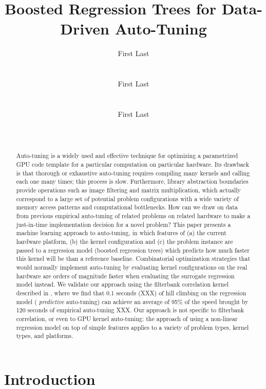\documentclass{sig-alternate}
\title{Boosted Regression Trees for Data-Driven Auto-Tuning}
\author{
\alignauthor First Last\\
\affaddr{Affiliation line 1}\\
\affaddr{Affiliation line 2}\\
\email{anon@mail.com}
\alignauthor First Last\\
\affaddr{Affiliation line 1}\\
\affaddr{Affiliation line 2}\\
\email{anon@mail.com}
\alignauthor First Last\\
\affaddr{Affiliation line 1}\\
\affaddr{Affiliation line 2}\\
\email{anon@mail.com}
}
\begin{document}
\maketitle

\begin{abstract}
Auto-tuning is a widely used and effective technique for optimizing a
parametrized GPU code template for a particular computation on particular
hardware.  Its drawback is that thorough or exhaustive auto-tuning requires
compiling many kernels and calling each one many times; this process is slow.
Furthermore, library abstraction boundaries provide operations such as image
filtering and matrix multiplication, which actually correspond to a large set
of potential problem configurations with a wide variety of memory access
patterns and computational bottlenecks.  How can we draw on data from previous
empirical auto-tuning of related problems on related hardware to make a just-in-time
implementation decision for a novel problem?  This paper presents a machine
learning approach to auto-tuning, in which features of (a) the current
hardware platform, (b) the kernel configuration and (c) the problem instance
are passed to a regression model (boosted regression trees) which predicts how
much faster this kernel will be than a reference baseline.  Combinatorial
optimization strategies that would normally implement auto-tuning by
evaluating kernel configurations on the real hardware are orders of magnitude
faster when evaluating the surrogate regression model instead.  We validate our approach
using the filterbank correlation kernel described in \citet{pinto+cox:2011gcg}, where we find
that 0.1 seconds (XXX) of hill climbing on the regression model ({\em
predictive}
auto-tuning) can achieve an
average of 95\% of the speed brought by 120 seconds of empirical auto-tuning XXX.  Our
approach is not specific to filterbank correlation, or even to GPU
kernel auto-tuning: the approach of using a non-linear regression model on top of
simple features applies to a variety of problem types, kernel types, and
platforms.
\end{abstract}

\section{Introduction}
\end{document}
